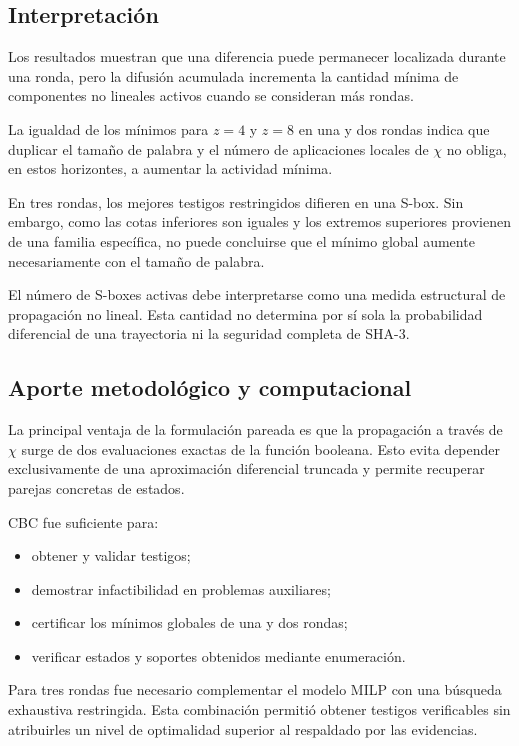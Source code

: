\subsection{Interpretación}
\label{subsec:conclusiones_interpretacion}

Los resultados muestran que una diferencia puede permanecer localizada
durante una ronda, pero la difusión acumulada incrementa la cantidad mínima
de componentes no lineales activos cuando se consideran más rondas.

La igualdad de los mínimos para $z=4$ y $z=8$ en una y dos rondas indica
que duplicar el tamaño de palabra y el número de aplicaciones locales de
$\chi$ no obliga, en estos horizontes, a aumentar la actividad mínima.

En tres rondas, los mejores testigos restringidos difieren en una S-box.
Sin embargo, como las cotas inferiores son iguales y los extremos superiores
provienen de una familia específica, no puede concluirse que el mínimo
global aumente necesariamente con el tamaño de palabra.

El número de S-boxes activas debe interpretarse como una medida estructural
de propagación no lineal. Esta cantidad no determina por sí sola la
probabilidad diferencial de una trayectoria ni la seguridad completa de
SHA-3.


\subsection{Aporte metodológico y computacional}
\label{subsec:aporte_metodologico}

La principal ventaja de la formulación pareada es que la propagación a
través de $\chi$ surge de dos evaluaciones exactas de la función booleana.
Esto evita depender exclusivamente de una aproximación diferencial
truncada y permite recuperar parejas concretas de estados.

CBC fue suficiente para:

\begin{itemize}
    \item obtener y validar testigos;
    \item demostrar infactibilidad en problemas auxiliares;
    \item certificar los mínimos globales de una y dos rondas;
    \item verificar estados y soportes obtenidos mediante enumeración.
\end{itemize}

Para tres rondas fue necesario complementar el modelo MILP con una búsqueda
exhaustiva restringida. Esta combinación permitió obtener testigos
verificables sin atribuirles un nivel de optimalidad superior al respaldado
por las evidencias.


